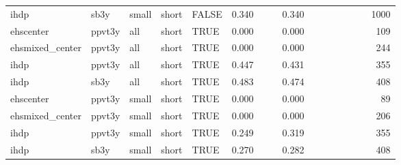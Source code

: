 \begin{table}[ht]
\begin{tabular}{lllllrrrrrrrrrrr}
  ihdp & sb3y & small & short & FALSE & 0.340 &  &  & 0.340 &  &  &  &  &  &  & 1000 \\ 
  ehscenter & ppvt3y & all & short & TRUE & 0.000 &  &  & 0.000 &  &  &  &  &  &  & 109 \\ 
  ehsmixed\_center & ppvt3y & all & short & TRUE & 0.000 &  &  & 0.000 &  &  &  &  &  &  & 244 \\ 
  ihdp & ppvt3y & all & short & TRUE & 0.447 &  &  & 0.431 &  &  &  &  &  &  & 355 \\ 
  ihdp & sb3y & all & short & TRUE & 0.483 &  &  & 0.474 &  &  &  &  &  &  & 408 \\ 
  ehscenter & ppvt3y & small & short & TRUE & 0.000 &  &  & 0.000 &  &  &  &  &  &  & 89 \\ 
  ehsmixed\_center & ppvt3y & small & short & TRUE & 0.000 &  &  & 0.000 &  &  &  &  &  &  & 206 \\ 
  ihdp & ppvt3y & small & short & TRUE & 0.249 &  &  & 0.319 &  &  &  &  &  &  & 355 \\ 
  ihdp & sb3y & small & short & TRUE & 0.270 &  &  & 0.282 &  &  &  &  &  &  & 408 \\ 
   \hline
\end{tabular}
\end{table}
